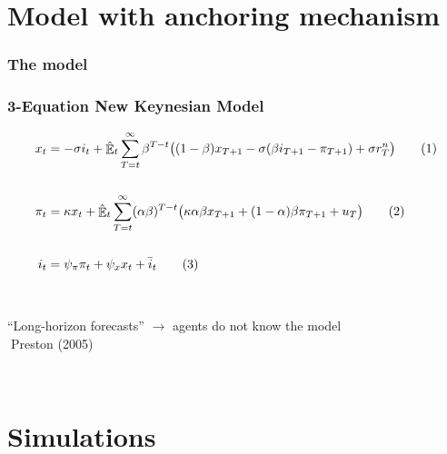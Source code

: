 \documentclass{beamer}
\DeclareMathOperator{\E}{\mathbb{E}}
\newcommand\numberthis{\addtocounter{equation}{1}\tag{\theequation}} %
\begin{document}
\section{Model with anchoring mechanism}

\begin{frame}
	\frametitle{The model}



\end{frame}

\begin{frame}
	\frametitle{3-Equation New Keynesian Model}
	\label{NK}

\begin{align*}
x_t &=  -\sigma i_t +\hat{\E}_t \sum_{T=t}^{\infty} \beta^{T-t }\big( (1-\beta)x_{T+1} - \sigma(\beta i_{T+1} - \pi_{T+1}) +\sigma r_T^n \big) \label{prestons18}  \numberthis \\
\\
\pi_t &= \kappa x_t +\hat{\E}_t \sum_{T=t}^{\infty} (\alpha\beta)^{T-t }\big( \kappa \alpha \beta x_{T+1} + (1-\alpha)\beta \pi_{T+1} + u_T\big) \label{prestons19}  \numberthis \\
\\
i_t &= \psi_{\pi}\pi_t + \psi_{x} x_t + \bar{i}_t \label{TR} \numberthis
\end{align*}

\

``Long-horizon forecasts'' $\rightarrow$ agents do not know the model\\
$\; $Preston (2005)

\

\hyperlink{compact}{}	


\end{frame}



\section{Simulations}
\end{document}

